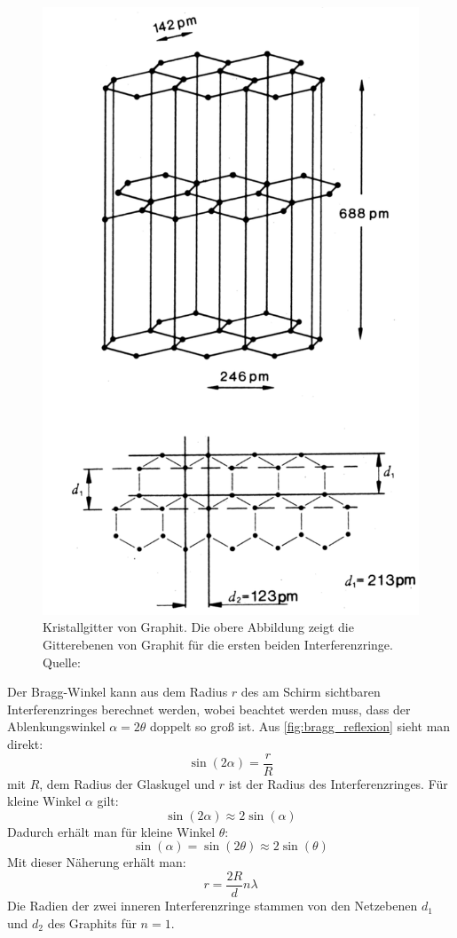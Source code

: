 \documentclass[ngerman]{scrartcl}
\begin{document}
\begin{figure}[H]
    \centering
    \begin{samepage}
        \includegraphics[width=0.6\linewidth]{fig/graphitgitter.png}
        \caption[Graphitkristallgitter]{Kristallgitter von Graphit. Die obere Abbildung zeigt die Gitterebenen von Graphit für die ersten beiden Interferenzringe. Quelle: \cite{ref:angabe_elektronen}}
        \label{fig:graphitgitter}
    \end{samepage}
\end{figure}
%
Der Bragg-Winkel kann aus dem Radius $r$ des am Schirm sichtbaren Interferenzringes berechnet werden, wobei beachtet werden muss, dass der Ablenkungswinkel $\alpha = 2\theta$ doppelt so groß ist. Aus \autoref{fig:bragg_reflexion} sieht man direkt:
%
\begin{equation}
    \label{eq:ablenkwinkel_radius}
    \sin(2\alpha) = \frac{r}{R}
\end{equation}
%
mit $R$, dem Radius der Glaskugel und $r$ ist der Radius des Interferenzringes. Für kleine Winkel $\alpha$ gilt:
%
\[\sin(2\alpha) \approx 2\sin(\alpha)\]
%
Dadurch erhält man für kleine Winkel $\theta$:
%
\[\sin(\alpha)=\sin(2\theta)\approx2\sin(\theta)\]
%
Mit dieser Näherung erhält man:
%
\begin{equation}
    \label{eq:radius_wellenlaenge}
    r=\frac{2R}{d}n\lambda
\end{equation}
%
Die Radien der zwei inneren Interferenzringe stammen von den Netzebenen $d_1$ und $d_2$ des Graphits für $n=1$.
\end{document}
